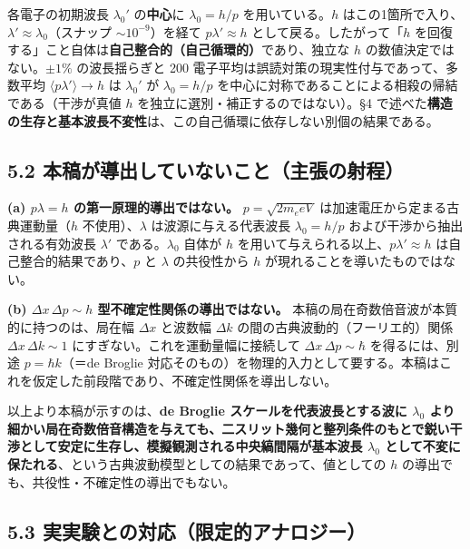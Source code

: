 \documentclass[11pt,a4paper]{ltjsarticle}
\begin{document}
各電子の初期波長 \(\lambda_0'\) の\textbf{中心}に \(\lambda_0=h/p\)
を用いている。\(h\)
はこの1箇所で入り、\(\lambda'\approx\lambda_0\)（スナップ
\(\sim10^{-9}\)）を経て \(p\lambda'\approx h\)
として戻る。したがって「\(h\)
を回復する」こと自体は\textbf{自己整合的（自己循環的）}であり、独立な
\(h\) の数値決定ではない。\(\pm1\%\) の波長揺らぎと 200
電子平均は誤読対策の現実性付与であって、多数平均
\(\langle p\lambda'\rangle\to h\) は \(\lambda_0'\) が \(\lambda_0=h/p\)
を中心に対称であることによる相殺の帰結である（干渉が真値 \(h\)
を独立に選別・補正するのではない）。§4
で述べた\textbf{構造の生存と基本波長不変性}は、この自己循環に依存しない別個の結果である。

\subsection{5.2
本稿が導出していないこと（主張の射程）}\label{ux672cux7a3fux304cux5c0eux51faux3057ux3066ux3044ux306aux3044ux3053ux3068ux4e3bux5f35ux306eux5c04ux7a0b}

\textbf{(a) \(p\lambda=h\) の第一原理的導出ではない。}
\(p=\sqrt{2m_eeV}\) は加速電圧から定まる古典運動量（\(h\)
不使用）、\(\lambda\) は波源に与える代表波長 \(\lambda_0=h/p\)
および干渉から抽出される有効波長 \(\lambda'\) である。\(\lambda_0\)
自体が \(h\) を用いて与えられる以上、\(p\lambda'\approx h\)
は自己整合的結果であり、\(p\) と \(\lambda\) の共役性から \(h\)
が現れることを導いたものではない。

\textbf{(b) \(\Delta x\,\Delta p\sim h\) 型不確定性関係の導出ではない。}
本稿の局在奇数倍音波が本質的に持つのは、局在幅 \(\Delta x\) と波数幅
\(\Delta k\) の間の古典波動的（フーリエ的）関係
\(\Delta x\,\Delta k\sim1\) にすぎない。これを運動量幅に接続して
\(\Delta x\,\Delta p\sim\hbar\) を得るには、別途 \(p=\hbar k\)（＝de
Broglie
対応そのもの）を物理的入力として要する。本稿はこれを仮定した前段階であり、不確定性関係を導出しない。

以上より本稿が示すのは、\textbf{de Broglie スケールを代表波長とする波に
\(\lambda_0\)
より細かい局在奇数倍音構造を与えても、二スリット幾何と整列条件のもとで鋭い干渉として安定に生存し、模擬観測される中央縞間隔が基本波長
\(\lambda_0\)
として不変に保たれる}、という古典波動模型としての結果であって、値としての
\(h\) の導出でも、共役性・不確定性の導出でもない。

\subsection{5.3
実実験との対応（限定的アナロジー）}\label{ux5b9fux5b9fux9a13ux3068ux306eux5bfeux5fdcux9650ux5b9aux7684ux30a2ux30caux30edux30b8ux30fc}
\end{document}
